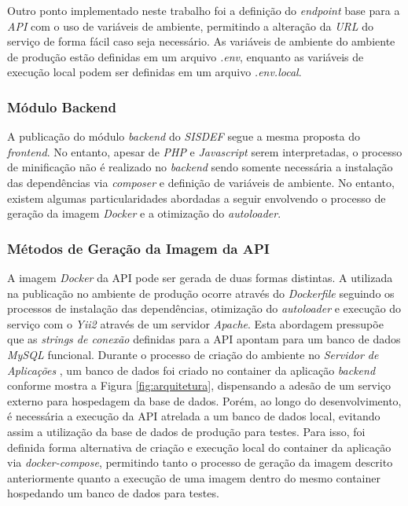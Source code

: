 \documentclass[nonacm, sigconf]{acmart}
\begin{document}
Outro ponto implementado neste trabalho foi a definição do \textit{endpoint} base para a \textit{API} com o uso de variáveis de ambiente, permitindo a alteração da \textit{URL} do serviço de forma fácil caso seja necessário. As variáveis de ambiente do ambiente de produção estão definidas em um arquivo \textit{.env}, enquanto as variáveis de execução local podem ser definidas em um arquivo \textit{.env.local}.

\subsubsection{Módulo Backend}
\label{section:backend-module}

A publicação do módulo \textit{backend} do \textit{SISDEF} segue a mesma proposta do \textit{frontend}. No entanto, apesar de \textit{PHP} e \textit{Javascript} serem interpretadas, o processo de minificação não é realizado no \textit{backend} sendo somente necessária a instalação das dependências via \textit{composer} e definição de variáveis de ambiente. No entanto, existem algumas particularidades abordadas a seguir envolvendo o processo de geração da imagem \textit{Docker} e a otimização do \textit{autoloader}.

\subsubsection{Métodos de Geração da Imagem da API}
\label{section:api-docker-image-generation}

A imagem \textit{Docker} da API pode ser gerada de duas formas distintas. A utilizada na publicação no ambiente de produção ocorre através do \textit{Dockerfile} seguindo os processos de instalação das dependências, otimização do \textit{autoloader} e execução do serviço com o 
\textit{Yii2} através de um servidor \textit{Apache}. Esta abordagem pressupõe que as \textit{strings de conexão} definidas para a API apontam para um banco de dados \textit{MySQL} funcional. Durante o processo de criação do ambiente no \textit{Servidor de Aplicações} \cite{graco-ufba}, um banco de dados foi criado no container da aplicação \textit{backend} conforme mostra a Figura \ref{fig:arquitetura}, dispensando a adesão de um serviço externo para hospedagem da base de dados. Porém, ao longo do desenvolvimento, é necessária a execução da API atrelada a um banco de dados local, evitando assim a utilização da base de dados de produção para testes. Para isso, foi definida forma alternativa de criação e execução local do container da aplicação via \textit{docker-compose}, permitindo tanto o processo de geração da imagem descrito anteriormente quanto a execução de uma imagem dentro do mesmo container hospedando um banco de dados para testes.
\end{document}
